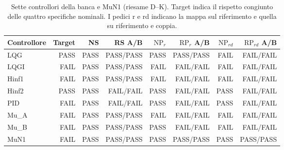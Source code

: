 \begin{table}[htbp]\centering\small
\setlength{\tabcolsep}{4pt}
\begin{tabular}{lrrrrrrr}\toprule
Controllore & Target & NS & RS A/B & $\mathrm{NP}_r$ & $\mathrm{RP}_r$ A/B & $\mathrm{NP}_{rd}$ & $\mathrm{RP}_{rd}$ A/B\\\midrule
LQG & PASS & PASS & PASS/PASS & PASS & PASS/PASS & FAIL & FAIL/FAIL\\
LQGI & FAIL & PASS & PASS/PASS & FAIL & FAIL/FAIL & FAIL & FAIL/FAIL\\
Hinf1 & FAIL & PASS & PASS/PASS & FAIL & FAIL/FAIL & FAIL & FAIL/FAIL\\
Hinf2 & PASS & PASS & FAIL/FAIL & PASS & FAIL/FAIL & PASS & FAIL/FAIL\\
PID & FAIL & PASS & FAIL/FAIL & PASS & FAIL/FAIL & PASS & FAIL/FAIL\\
Mu\_A & FAIL & PASS & PASS/PASS & FAIL & FAIL/FAIL & FAIL & FAIL/FAIL\\
Mu\_B & FAIL & PASS & PASS/PASS & PASS & FAIL/FAIL & FAIL & FAIL/FAIL\\
MuN1 & FAIL & PASS & PASS/PASS & PASS & PASS/PASS & PASS & PASS/PASS\\
\bottomrule\end{tabular}
\caption{Sette controllori della banca e MuN1 (riesame D--K). Target indica il rispetto congiunto delle quattro specifiche nominali. I pedici r e rd indicano la mappa sul riferimento e quella su riferimento e coppia.}
\label{tab:confronto-per-ruolo}
\end{table}
